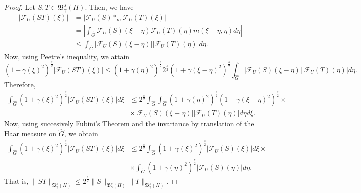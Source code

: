\documentclass[10pt,a4paper]{amsart}
\begin{document}
\begin{proof}
Let $S,T\in \mathfrak{B}^s_\gamma(H)$. Then, we have 
\begin{align*}
|\mathcal{F}_U(ST)(\xi)|&=\left|\mathcal{F}_U(S) \ast_m\mathcal{F}_U(T)(\xi)\right|\\
&=\left|\int_{\widehat{G}}\mathcal{F}_U(S)(\xi-\eta)\mathcal{F}_U(T)(\eta)m(\xi-\eta,\eta)d\eta\right|\\
&\leq \int_{\widehat{G}}|\mathcal{F}_U(S)(\xi-\eta)||\mathcal{F}_U(T)(\eta)|d\eta. 
\end{align*}
Now, using Peetre's inequality, we attain
$$(1+\gamma(\xi)^2)^{\frac{s}{2}}|\mathcal{F}_U(ST)(\xi)|\leq (1+\gamma(\eta)^2)^{\frac{s}{2}} 2^{\frac{s}{2}}(1+\gamma(\xi-\eta)^2)^{\frac{s}{2}}\int_{\widehat{G}}|\mathcal{F}_U(S)(\xi-\eta)||\mathcal{F}_U(T)(\eta)|d\eta.$$
Therefore, 
\begin{align*}
\int_{\widehat{G}}(1+\gamma(\xi)^2)^{\frac{s}{2}}|\mathcal{F}_U(ST)(\xi)|d\xi &\leq 2^{\frac{s}{2}}\int_{\widehat{G}}\int_{\widehat{G}}(1+\gamma(\eta)^2)^{\frac{s}{2}} (1+\gamma(\xi-\eta)^2)^{\frac{s}{2}}\times \\
&\times |\mathcal{F}_U(S)(\xi-\eta)||\mathcal{F}_U(T)(\eta)|d\eta d\xi.
\end{align*}
Now, using succesively Fubini's Theorem and the invariance by translation of the Haar measure on $\widehat{G}$, we obtain
\begin{align*}
\int_{\widehat{G}}(1+\gamma(\xi)^2)^{\frac{s}{2}}|\mathcal{F}_U(ST)(\xi)|d\xi &\leq 2^{\frac{s}{2}}\int_{\widehat{G}}(1+\gamma(\xi)^2)^{\frac{s}{2}}|\mathcal{F}_U(S)(\xi)|d\xi\times\\
&\times \int_{\widehat{G}}(1+\gamma(\eta)^2)^{\frac{s}{2}}|\mathcal{F}_U(S)(\eta)|d\eta.
\end{align*}
That is, $ \|ST\|_{\mathfrak{B}^s_\gamma(H)}\leq 2^{\frac{s}{2}}\|S\|_{\mathfrak{B}^s_\gamma(H)} \|T\|_{\mathfrak{B}^s_\gamma(H)}$.
\end{proof}
\end{document}
